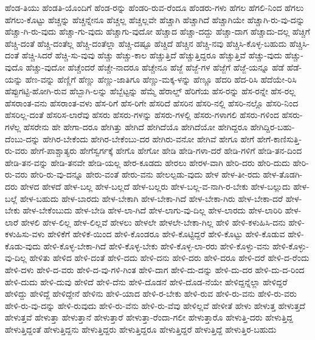 {ಹೆಂಡ-ತಿಯು
ಹೆಂಡತಿ-ಯೊಂದಿಗೆ
ಹೆಂಡ-ರನ್ನು
ಹೆಂಡರಿ-ರುವ-ರೆಂದೂ
ಹೆಂಡರು-ಗಳು
ಹೆಗಲ
ಹೆಗಲಿ-ನಿಂದ
ಹೆಗಲು
ಹೆಗಲು-ಕೊಟ್ಟು
ಹೆಚ್ಚನ್ನು
ಹೆಚ್ಚನ್ನೇನೂ
ಹೆಚ್ಚಲ್ಲ
ಹೆಚ್ಚಲ್ಲವೇ
ಹೆಚ್ಚಾಗಿ
ಹೆಚ್ಚಾಗಿದೆ
ಹೆಚ್ಚಾಗಿಯೇ
ಹೆಚ್ಚಾಗಿ-ರು-ವು-ದನ್ನು
ಹೆಚ್ಚಾ-ಗಿ-ರು-ವುದು
ಹೆಚ್ಚಾ-ಗು-ವುದು
ಹೆಚ್ಚಾಗು-ವುದೋ
ಹೆಚ್ಚಾದ
ಹೆಚ್ಚಾ-ದದ್ದು
ಹೆಚ್ಚಾ-ದಾಗ
ಹೆಚ್ಚಾದು-ದಲ್ಲ
ಹೆಚ್ಚಿಗೆ
ಹೆಚ್ಚಿ-ದಂತೆ
ಹೆಚ್ಚಿ-ದಂತೆಲ್ಲ
ಹೆಚ್ಚಿ-ದಂತೆಲ್ಲಾ
ಹೆಚ್ಚಿ-ದಷ್ಟೂ
ಹೆಚ್ಚಿದೆ
ಹೆಚ್ಚಿನ
ಹೆಚ್ಚಿ-ನವು
ಹೆಚ್ಚಿಸಿ-ಕೊಳ್ಳ-ಬಹುದು
ಹೆಚ್ಚಿಸಿ-ದಂತೆ
ಹೆಚ್ಚಿ-ಸಿದರೆ
ಹೆಚ್ಚಿ-ಸು-ವುವು
ಹೆಚ್ಚು
ಹೆಚ್ಚು-ಕಾಲ
ಹೆಚ್ಚುತ್ತಿದೆ
ಹೆಚ್ಚುತ್ತಿದ್ದರೂ
ಹೆಚ್ಚುತ್ತಿವೆ
ಹೆಚ್ಚು-ವುದು
ಹೆಚ್ಚು-ವುದೊ
ಹೆಚ್ಚು-ವುದೋ
ಹೆಚ್ಚೆಂದರೆ
ಹೆಚ್ಚೇ-ನಾದರೂ
ಹೆಚ್ಚೇನೂ
ಹೆಜ್ಜೆ
ಹೆಜ್ಜೆ-ಗಳ
ಹೆಜ್ಜೆಗೆ
ಹೆಜ್ಜೆ-ಯನ್ನೂ
ಹೆಡೆ
ಹೆಡೆ-ಯನ್ನು
ಹೆಣ-ವನ್ನು
ಹೆಣ್ಣಿಗೆ
ಹೆಣ್ಣು
ಹೆಣ್ಣು-ಜಾತಿಗೂ
ಹೆಣ್ಣು-ಮಕ್ಕ-ಳನ್ನು
ಹೆಣ್ಣೂ
ಹೆದರಿ
ಹೆದ-ರಿಸಿ
ಹೆದೆಯೇ-ರಿಸಿ
ಹೆಪ್ಪುಗಟ್ಟಿ-ಹೋಗಿ-ರುವ
ಹೆಬ್ಬಾಗಿ-ಲನ್ನು
ಹೆಬ್ಬೆಟ್ಟನ್ನು
ಹೆಮ್ಮೆ
ಹೆರಾಲ್ಡ್
ಹೆರಿಗೆಯ
ಹೆಸ-ರನ್ನು
ಹೆಸ-ರನ್ನೇ
ಹೆಸ-ರಲ್ಲ
ಹೆಸರಾಂತ-ವನು
ಹೆಸರಾಂತ-ವಳು
ಹೆಸ-ರಿಗೆ
ಹೆಸ-ರಿಗೇ
ಹೆಸರಿದೆ
ಹೆಸರಿನ
ಹೆಸರಿ-ನಲ್ಲಿ
ಹೆಸರಿ-ನಲ್ಲೊ
ಹೆಸರಿ-ನಿಂದ
ಹೆಸರಿಲ್ಲ-ದಂತೆ
ಹೆಸರಿಸ-ಲಾರೆವು
ಹೆಸರು
ಹೆಸರು-ಗಳನ್ನು
ಹೆಸರು-ಗಳಲ್ಲಿ
ಹೆಸರು-ಗಳಾಗಲಿ
ಹೆಸರು-ಗಳಿಂದ
ಹೆಸರು-ಗಳೆಲ್ಲ
ಹೆಸರೇನು
ಹೇ
ಹೇಗಾ-ದರೂ
ಹೇಗಿತ್ತು
ಹೇಗಿದೆ
ಹೇಗಿದೆಯೊ
ಹೇಗಿದೆಯೋ
ಹೇಗಿದ್ದರೂ
ಹೇಗಿದ್ದಿರ-ಬಹು-ದೆಂಬು-ದನ್ನು
ಹೇಗಿರ-ಬೇಕೆಂದು
ಹೇಗಿರ-ಬೇಕೆಂಬು-ದರ
ಹೇಗಿರು-ವನೋ
ಹೇಗಿವೆ
ಹೇಗೂ
ಹೇಗೆ
ಹೇಗೆ-ಕಾಣಿಸುತ್ತಿ-ರು-ವರು
ಹೇಗೆ-ಪಾಶ್ಚಾತ್ಯರು
ಹೇಗೆಸ್ವರ್ಗಕ್ಕೆ
ಹೇಗೊ
ಹೇಗೋ
ಹೇಡಿ
ಹೇಡಿ-ಗಳಾ-ದರೆ
ಹೇಡಿ-ಗಳಿಗೆ
ಹೇಡಿ-ತನ-ದಿಂದ
ಹೇಡಿ-ತನ-ವನ್ನು
ಹೇಡಿ-ತನವೇ
ಹೇಡಿ-ಯಲ್ಲ
ಹೇರ-ಕೂಡದು
ಹೇರಲು
ಹೇರಳ-ವಾಗಿ
ಹೇರಿ-ದರು
ಹೇರಿ-ದುದು
ಹೇರಿ-ರು-ವರು
ಹೇರಿ-ರು-ವು-ದನ್ನೂ
ಹೇರು-ವಂತೆ
ಹೇರು-ವನು
ಹೇಲಲ್ಪಡು-ವುದು
ಹೇಳ
ಹೇಳ-ತೀ-ರದು
ಹೇಳ-ತೊಡಗಿ-ದರು
ಹೇಳದ
ಹೇಳದೆ
ಹೇಳ-ಬಲ್ಲ
ಹೇಳ-ಬಲ್ಲದೆ
ಹೇಳ-ಬಲ್ಲರು
ಹೇಳ-ಬಲ್ಲ-ವ-ನಾಗಿ-ರ-ಬೇಕು
ಹೇಳ-ಬಲ್ಲುದು
ಹೇಳ-ಬಲ್ಲೆ
ಹೇಳ-ಬಹುದು
ಹೇಳ-ಬಾರದು
ಹೇಳ-ಬೇಕಾಗಿ
ಹೇಳ-ಬೇಕಾ-ಗಿದೆ
ಹೇಳ-ಬೇಕಾ-ಗಿರು
ಹೇಳ-ಬೇಕಾ-ದರೆ
ಹೇಳ-ಬೇಕು
ಹೇಳ-ಬೇಕೆಂಬುದು
ಹೇಳ-ಬೇಡಿ
ಹೇಳ-ಲಾ-ಗಿದೆ
ಹೇಳ-ಲಾಗು-ವು-ದಿಲ್ಲ
ಹೇಳ-ಲಾರದು
ಹೇಳ-ಲಾರಿರಿ
ಹೇಳ-ಲಾರೆ
ಹೇಳಲಿ
ಹೇಳ-ಲಿಲ್ಲ
ಹೇಳ-ಲಿಲ್ಲವೆ
ಹೇಳಲು
ಹೇಳಲೇ
ಹೇಳಲೇ-ಬೇಕಾ-ಗಿಲ್ಲ
ಹೇಳಿ
ಹೇಳಿ-ಕಳುಹಿಸಿ-ದನು
ಹೇಳಿ-ಕಳುಹಿಸು-ವಳು
ಹೇಳಿಕೆಗೆ
ಹೇಳಿಕೆ-ಯಿಂದ
ಹೇಳಿ-ಕೊಂಡರೂ
ಹೇಳಿ-ಕೊಟ್ಟಿದ್ದರೆ
ಹೇಳಿ-ಕೊಟ್ಟು
ಹೇಳಿ-ಕೊಡುವ
ಹೇಳಿ-ಕೊಡು-ವುದು
ಹೇಳಿ-ಕೊಳ್ಳ-ಬೇಕಾ-ಗಿದೆ
ಹೇಳಿ-ಕೊಳ್ಳ-ಬೇಕು
ಹೇಳಿ-ಕೊಳ್ಳ-ಲಾ-ರರು
ಹೇಳಿ-ಕೊಳ್ಳು-ವನು
ಹೇಳಿ-ಕೊಳ್ಳು-ವು-ದಿಲ್ಲ
ಹೇಳಿತು
ಹೇಳಿದ
ಹೇಳಿ-ದಂತೆ
ಹೇಳಿ-ದದು
ಹೇಳಿ-ದನು
ಹೇಳಿ-ದರು
ಹೇಳಿ-ದರೂ
ಹೇಳಿ-ದರೆ
ಹೇಳಿ-ದ-ರೆಂದು
ಹೇಳಿ-ದಳು
ಹೇಳಿ-ದ-ವರು
ಹೇಳಿ-ದ-ವು-ಗಳಿ-ಗಿಂತ
ಹೇಳಿ-ದಾಗ
ಹೇಳಿ-ದು-ದನ್ನು
ಹೇಳಿ-ದು-ದರ
ಹೇಳಿ-ದು-ದ-ರಿಂದ
ಹೇಳಿ-ದುದು
ಹೇಳಿ-ದುವು
ಹೇಳಿದೆ
ಹೇಳಿ-ದೆನು
ಹೇಳಿ-ದೊಡನೆ
ಹೇಳಿ-ದೊಡ-ನೆಯೇ
ಹೇಳಿದ್ದನ್ನೆಲ್ಲಾ
ಹೇಳಿದ್ದರೆ
ಹೇಳಿದ್ದು
ಹೇಳಿದ್ದೆ
ಹೇಳಿದ್ದೇನೆ
ಹೇಳಿನು
ಹೇಳಿ-ಯಾದ
ಹೇಳಿ-ರ-ಬೇಕು
ಹೇಳಿ-ರುವ
ಹೇಳಿ-ರು-ವನು
ಹೇಳಿ-ರು-ವರು
ಹೇಳಿ-ರು-ವು-ದನ್ನು
ಹೇಳಿ-ರುವುದು
ಹೇಳಿ-ರು-ವೆನು
ಹೇಳಿ-ರು-ವೆವು
ಹೇಳಿಲ್ಲವೆ
ಹೇಳೀತೆ
ಹೇಳು
ಹೇಳುತ್ತ
ಹೇಳುತ್ತದೆ
ಹೇಳುತ್ತವೆ
ಹೇಳುತ್ತಾ
ಹೇಳುತ್ತಾನೆ
ಹೇಳುತ್ತಾರೆ
ಹೇಳುತ್ತಾ-ರೆಂದಾ-ಗಲೀ
ಹೇಳುತ್ತಾರೊ
ಹೇಳುತ್ತಿ-ದರು
ಹೇಳುತ್ತಿದ್ದ
ಹೇಳುತ್ತಿದ್ದಂತೆ
ಹೇಳುತ್ತಿದ್ದನು
ಹೇಳುತ್ತಿದ್ದರು
ಹೇಳುತ್ತಿದ್ದರೂ
ಹೇಳುತ್ತಿದ್ದರೆ
ಹೇಳುತ್ತಿದ್ದೆ
ಹೇಳುತ್ತಿರ-ಬಹುದು
}
